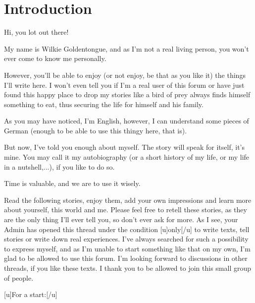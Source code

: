 \chapter{Introduction}
\label{cha:introduction}
Hi, you lot out there!

My name is Wilkie Goldentongue, and as I'm not a real living person, you won't ever come to know me personally.

However, you'll be able to enjoy (or not enjoy, be that as you like it) the things I'll write here.
I won't even tell you if I'm a real user of this forum or have just found this happy place to drop my stories like a bird of prey always finds himself something to eat, thus securing the life for himself and his family.

As you may have noticed, I'm English, however, I can understand some pieces of German (enough to be able to use this thingy here, that is). 

But now, I've told you enough about myself. The story will speak for itself, it's mine. You may call it my autobiography (or a short history of my life, or my life in a nutshell,...), if you like to do so. 

Time is valuable, and we are to use it wisely. 

Read the following stories, enjoy them, add your own impressions and learn more about yourself, this world and me. Please feel free to retell these stories, as they are the only thing I'll ever tell you, so don't ever ask for more. As I see, your Admin has opened this thread under the condition [u]only[/u] to write texts, tell stories or write down real experiences. I've always searched for such a possibility to express myself, and as I'm unable to start something like that on my own, I'm glad to be allowed to use this forum. I'm looking forward to discussions in other threads, if you like these texts. I thank you to be allowed to join this small group of people. 


[u]For a start:[/u]

